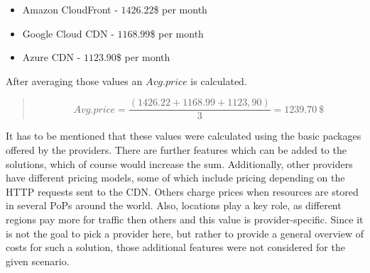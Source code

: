 \begin{itemize}[noitemsep]
	\item Amazon CloudFront - $1426.22$\$ per month
	\item Google Cloud CDN - $1168.99$\$ per month
	\item Azure CDN - $1123.90$\$ per month
\end{itemize} 

After averaging those values an $Avg. price$ is calculated.  

\begin{quote}
	\begin{center}
		\begin{equation*}
			Avg. price = 
			\frac{
				\left(1426.22 + 1168.99 + 1123,90\right)
			}{
				3
			} = 1239.70 \: \$
		\end{equation*}
	\end{center} 
\end{quote}

It has to be mentioned that these values were calculated using the basic packages offered by the providers. There are further features which can be added to the solutions, which of course would increase the sum. Additionally, other providers have different pricing models, some of which include pricing depending on the HTTP requests sent to the CDN. Others charge prices when resources are stored in several PoPs around the world. Also, locations play a key role, as different regions pay more for traffic then others and this value is provider-specific.
Since it is not the goal to pick a provider here, but rather to provide a general overview of costs for such a solution, those additional features were not considered for the given scenario.



